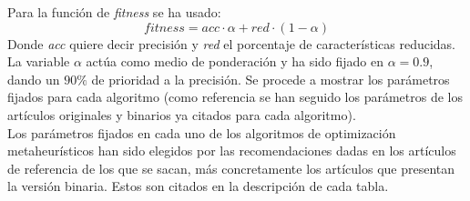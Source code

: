 Para la función de \textit{fitness} se ha usado:
\begin{equation}
    fitness = acc\cdot\alpha + red\cdot(1-\alpha)
    \label{eq:fitness}
\end{equation}
Donde \textit{acc} quiere decir precisión y \textit{red} el porcentaje de características reducidas. La variable $\alpha$ actúa como medio de ponderación y ha sido fijado en $\alpha=0.9$, dando un $90\%$ de prioridad a la precisión.
Se procede a mostrar los parámetros fijados para cada algoritmo (como referencia se han seguido los parámetros de los artículos originales y binarios ya citados para cada algoritmo).\\[6pt]
Los parámetros fijados en cada uno de los algoritmos de optimización metaheurísticos han sido elegidos por las recomendaciones dadas en los artículos de referencia de los que se sacan, más concretamente los artículos que presentan la versión binaria. Estos son citados en la descripción de cada tabla.

